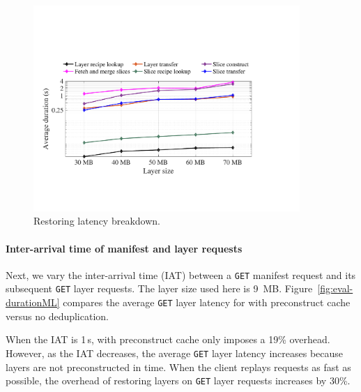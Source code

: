 \begin{figure}[t]
\begin{minipage}{0.3\textwidth}
	\includegraphics[width=0.9\textwidth]{graphs/restoringbreakdown.pdf}
	\caption{Restoring latency breakdown. }
	\label{fig:eval-restoringbreakdown}
	\end{minipage}
\end{figure}
 
\paragraph{Inter-arrival time of manifest and layer requests}
%
Next, we vary the inter-arrival time (IAT) between a \texttt{GET} manifest request and its
subsequent \texttt{GET} layer requests.
%
The layer size used here is 9~MB.
%
Figure~\ref{fig:eval-durationML} compares the average \texttt{GET} layer latency for
\sysname with preconstruct cache versus no deduplication.

When the IAT is 1\,s, \sysname with preconstruct cache only imposes a 19\% overhead.
%
However, as the IAT decreases, the average \texttt{GET} layer latency increases because
layers are not preconstructed in time.
%
When the client replays requests as fast as possible, the overhead of restoring layers on
\texttt{GET} layer requests increases by 30\%.
%

